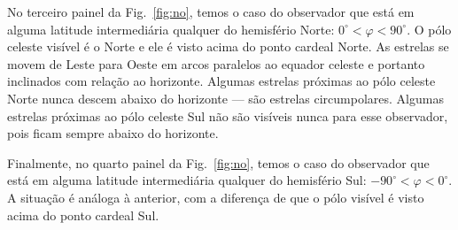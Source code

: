 No terceiro painel da Fig.~\ref{fig:no}, temos o caso do observador que está em alguma latitude intermediária qualquer do hemisfério Norte: $0^{\circ} < \varphi < 90^{\circ}$. O pólo celeste visível é o Norte e ele é visto acima do ponto cardeal Norte. As estrelas se movem de Leste para Oeste em arcos paralelos ao equador celeste e portanto inclinados com relação ao horizonte. Algumas estrelas próximas ao pólo celeste Norte nunca descem abaixo do horizonte --- são estrelas circumpolares. Algumas estrelas próximas ao pólo celeste Sul não são visíveis nunca para esse observador, pois ficam sempre abaixo do horizonte.

Finalmente, no quarto painel da Fig.~\ref{fig:no}, temos o caso do observador que está em alguma latitude intermediária qualquer do hemisfério Sul: $-90^{\circ} < \varphi < 0^{\circ}$. A situação é análoga à anterior, com a diferença de que o pólo visível é visto acima do ponto cardeal Sul.

